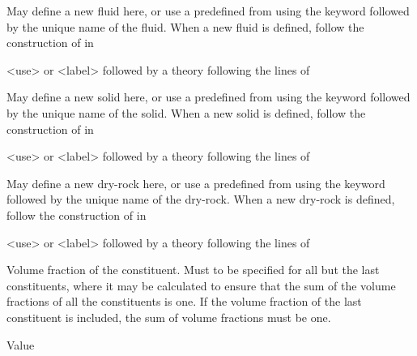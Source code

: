 {
 \slist
   \item \Description May define a new fluid here, or use a predefined  from  using the keyword  followed by the unique name of the fluid. When a new fluid is defined, follow the construction of  in 
   \item \Argument <use> or <label> followed by a theory following the lines of 
   \item \Default
 \elist

 \slist
   \item \Description May define a new solid here, or use a predefined  from  using the keyword  followed by the unique name of the solid. When a new solid is defined, follow the construction of  in 
   \item \Argument <use> or <label> followed by a theory following the lines of 
   \item \Default
 \elist

 \slist
   \item \Description  May define a new dry-rock here, or use a predefined  from  using the keyword  followed by the unique name of the dry-rock. When a new dry-rock is defined, follow the construction of  in 
   \item \Argument <use> or <label> followed by a theory following the lines of 
   \item \Default
 \elist

 \slist
   \item \Description Volume fraction of the constituent. Must to be specified for all but the last constituents, where it may be calculated to ensure that the sum of the volume fractions of all the constituents is one. If the volume fraction of the last constituent is included, the sum of volume fractions must be one. 
   \item \Argument Value
   \item \Default
 \elist

}
